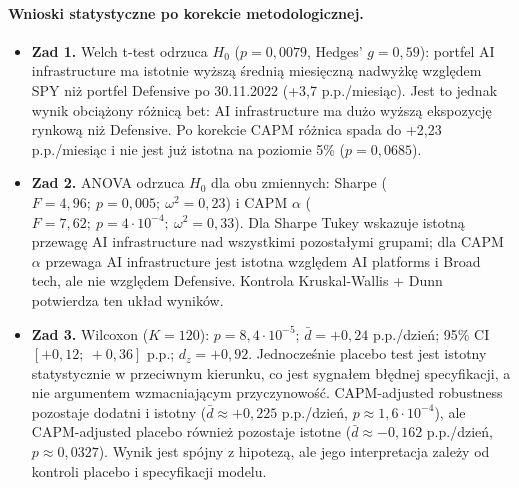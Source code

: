 \documentclass[11pt,a4paper]{article}
\begin{document}
\paragraph{Wnioski statystyczne po korekcie metodologicznej.}
\begin{itemize}
  \item \textbf{Zad 1.} Welch t-test odrzuca $H_0$ ($p = 0{,}0079$,
        Hedges' $g = 0{,}59$): portfel AI infrastructure ma istotnie wyższą
        średnią miesięczną nadwyżkę względem SPY niż portfel Defensive po
        30.11.2022 (+3{,}7 p.p./miesiąc). Jest to jednak wynik obciążony
        różnicą bet: AI infrastructure ma dużo wyższą ekspozycję rynkową niż
        Defensive. Po korekcie CAPM różnica spada do +2{,}23 p.p./miesiąc
        i nie jest już istotna na poziomie 5\% ($p=0{,}0685$).
  \item \textbf{Zad 2.} ANOVA odrzuca $H_0$ dla obu zmiennych: Sharpe
        ($F = 4{,}96;\ p = 0{,}005;\ \omega^2 = 0{,}23$) i CAPM $\alpha$
        ($F = 7{,}62;\ p = 4 \cdot 10^{-4};\ \omega^2 = 0{,}33$). Dla Sharpe
        Tukey wskazuje istotną przewagę AI infrastructure nad wszystkimi
        pozostałymi grupami; dla CAPM $\alpha$ przewaga AI infrastructure jest
        istotna względem AI platforms i Broad tech, ale nie względem Defensive.
        Kontrola Kruskal-Wallis + Dunn potwierdza ten układ wyników.
  \item \textbf{Zad 3.} Wilcoxon ($K = 120$): $p = 8{,}4 \cdot 10^{-5}$;
        $\bar d = +0{,}24$ p.p./dzień; 95\% CI $[+0{,}12;\ +0{,}36]$ p.p.;
        $d_z = +0{,}92$. Jednocześnie placebo test jest istotny statystycznie
        w przeciwnym kierunku, co jest sygnałem błędnej specyfikacji, a nie
        argumentem wzmacniającym przyczynowość. CAPM-adjusted robustness
        pozostaje dodatni i istotny ($\bar d \approx +0{,}225$ p.p./dzień,
        $p \approx 1{,}6 \cdot 10^{-4}$), ale CAPM-adjusted placebo również
        pozostaje istotne ($\bar d \approx -0{,}162$ p.p./dzień,
        $p \approx 0{,}0327$). Wynik jest spójny z hipotezą, ale jego
        interpretacja zależy od kontroli placebo i specyfikacji modelu.
\end{itemize}
\end{document}
